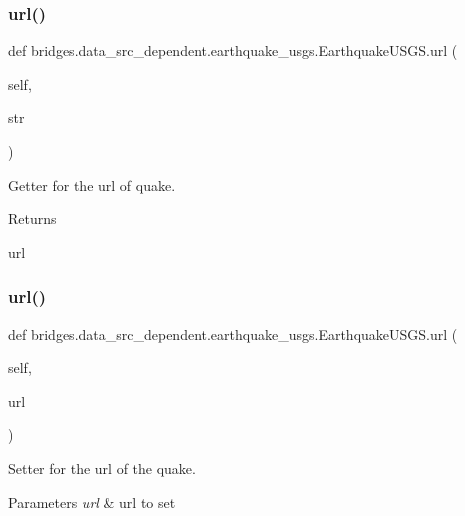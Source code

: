 \subsubsection{\texorpdfstring{url()}{url()}\hspace{0.1cm}{\footnotesize\ttfamily [1/2]}}
{\footnotesize\ttfamily def bridges.\+data\+\_\+src\+\_\+dependent.\+earthquake\+\_\+usgs.\+Earthquake\+U\+S\+G\+S.\+url (\begin{DoxyParamCaption}\item[{}]{self,  }\item[{}]{str }\end{DoxyParamCaption})}



Getter for the url of quake. 

\begin{DoxyReturn}{Returns}


url 
\end{DoxyReturn}
\mbox{\label{classbridges_1_1data__src__dependent_1_1earthquake__usgs_1_1_earthquake_u_s_g_s_afc4af59842186d2f0198b3e6d0690a95}} 
\subsubsection{\texorpdfstring{url()}{url()}\hspace{0.1cm}{\footnotesize\ttfamily [2/2]}}
{\footnotesize\ttfamily def bridges.\+data\+\_\+src\+\_\+dependent.\+earthquake\+\_\+usgs.\+Earthquake\+U\+S\+G\+S.\+url (\begin{DoxyParamCaption}\item[{}]{self,  }\item[{}]{url }\end{DoxyParamCaption})}



Setter for the url of the quake. 


\begin{DoxyParams}{Parameters}
{\em url} & url to set \\
\hline
\end{DoxyParams}


